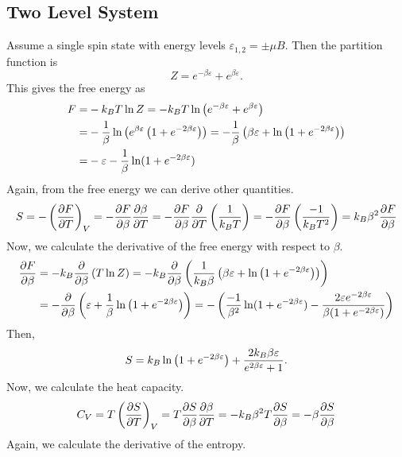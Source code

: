 \subsection{Two Level System}
    Assume a single spin state with energy levels $\varepsilon_{1,2}=\pm \mu B$. Then the partition function is
    \begin{equation}
        Z = e^{-\beta\varepsilon}+e^{\beta\varepsilon}.
    \end{equation}
    This gives the free energy as
    \begin{align}
        F =& -k_BT\ln Z = -k_BT\ln\left( e^{-\beta\varepsilon}+e^{\beta\varepsilon} \right)\notag\\
        =& -\frac{1}{\beta}\ln\left( e^{\beta\varepsilon}\left( 1+e^{-2\beta\varepsilon} \right) \right)=-\frac{1}{\beta}\left( \beta\varepsilon+\ln\left( 1+e^{-2\beta\varepsilon} \right) \right)\notag\\
        =& -\varepsilon - \frac{1}{\beta}\ln(1+e^{-2\beta\varepsilon})
    \end{align}
    Again, from the free energy we can derive other quantities.
    \begin{equation}
        S = -\left( \frac{\partial F}{\partial T} \right)_V = -\frac{\partial F}{\partial \beta}\frac{\partial \beta}{\partial T} = -\frac{\partial F}{\partial \beta}\frac{\partial }{\partial T}\left( \frac{1}{k_BT} \right)=-\frac{\partial F}{\partial \beta}\left( \frac{-1}{k_BT^2} \right)=k_B\beta^2\frac{\partial F}{\partial \beta}
    \end{equation}
    Now, we calculate the derivative of the free energy with respect to $\beta$.
    \begin{align}
        \frac{\partial F}{\partial \beta} &= -k_B\frac{\partial }{\partial \beta}\left( T\ln Z \right)=-k_B\frac{\partial }{\partial \beta}\left( \frac{1}{k_B\beta}\left( \beta\varepsilon+\ln\left( 1+e^{-2\beta\varepsilon} \right) \right) \right)\notag\\
        &=-\frac{\partial }{\partial \beta}\left( \varepsilon+\frac{1}{\beta}\ln\left( 1+e^{-2\beta\varepsilon} \right) \right)=-\left( \frac{-1}{\beta^2}\ln(1+e^{-2\beta\varepsilon})-\frac{2\varepsilon e^{-2\beta\varepsilon}}{\beta(1+e^{-2\beta\varepsilon})} \right)
    \end{align}
    Then,
    \begin{equation}
        S = k_B\ln\left( 1+e^{-2\beta\varepsilon} \right)+\frac{2k_B\beta\varepsilon}{e^{2\beta\varepsilon}+1}.
    \end{equation}
    Now, we calculate the heat capacity.
    \begin{align}
        C_V = T\left( \frac{\partial S}{\partial T} \right)_V = T\frac{\partial S}{\partial \beta}\frac{\partial \beta}{\partial T}=-k_B\beta^2T\frac{\partial S}{\partial \beta} = -\beta\frac{\partial S}{\partial \beta}
    \end{align}
    Again, we calculate the derivative of the entropy.
